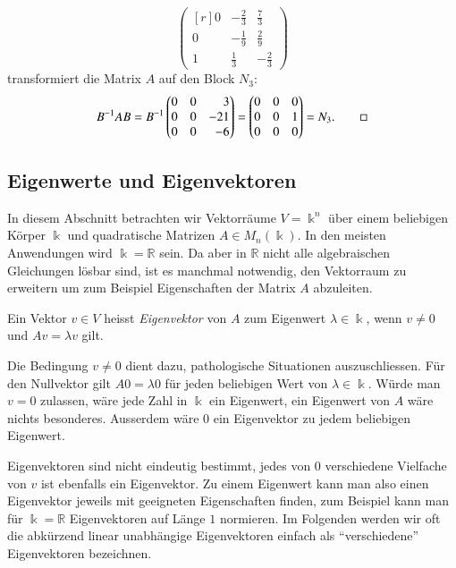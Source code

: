 \begin{beispiel}
\[\begin{pmatrix*}[r]
0&-\frac23& \frac73\\
0&-\frac19& \frac29\\
1& \frac13&-\frac23
\end{pmatrix*}
\]
transformiert die Matrix $A$ auf den Block $N_3$:
\[
B^{-1}AB
=
B^{-1}\begin{pmatrix*}[r]
0&0&  3\\
0&0&-21\\
0&0& -6
\end{pmatrix*}
=
\begin{pmatrix}
0&0&0\\
0&0&1\\
0&0&0
\end{pmatrix}
=
N_3.
\qedhere
\]
\end{beispiel}

%
%
\subsection{Eigenwerte und Eigenvektoren
\label{buch:subsection:eigenwerte-und-eigenvektoren}}
In diesem Abschnitt betrachten wir Vektorräume $V=\Bbbk^n$ über einem
beliebigen Körper $\Bbbk$ und quadratische Matrizen
$A\in M_n(\Bbbk)$.
In den meisten Anwendungen wird $\Bbbk=\mathbb{R}$ sein.
Da aber in $\mathbb{R}$ nicht alle algebraischen Gleichungen lösbar sind,
ist es manchmal notwendig, den Vektorraum zu erweitern um zum Beispiel
Eigenschaften der Matrix $A$ abzuleiten.

\begin{definition}
Ein Vektor $v\in V$ heisst {\em Eigenvektor} von $A$ zum Eigenwert
$\lambda\in\Bbbk$, wenn $v\ne 0$ und $Av=\lambda v$ gilt.
\end{definition}

Die Bedingung $v\ne 0$ dient dazu, pathologische Situationen auszuschliessen.
Für den Nullvektor gilt $A0=\lambda 0$ für jeden beliebigen Wert von
$\lambda\in\Bbbk$.
Würde man $v=0$ zulassen, wäre jede Zahl in $\Bbbk$ ein Eigenwert,
ein Eigenwert von $A$ wäre nichts besonderes.
Ausserdem wäre $0$ ein Eigenvektor zu jedem beliebigen Eigenwert.

Eigenvektoren sind nicht eindeutig bestimmt, jedes von $0$ verschiedene
Vielfache von $v$ ist ebenfalls ein Eigenvektor.
Zu einem Eigenwert kann man also einen Eigenvektor jeweils mit 
geeigneten Eigenschaften finden, zum Beispiel kann man für $\Bbbk = \mathbb{R}$
Eigenvektoren auf Länge $1$ normieren.
Im Folgenden werden wir oft die abkürzend linear unabhängige Eigenvektoren
einfach als ``verschiedene'' Eigenvektoren bezeichnen.


